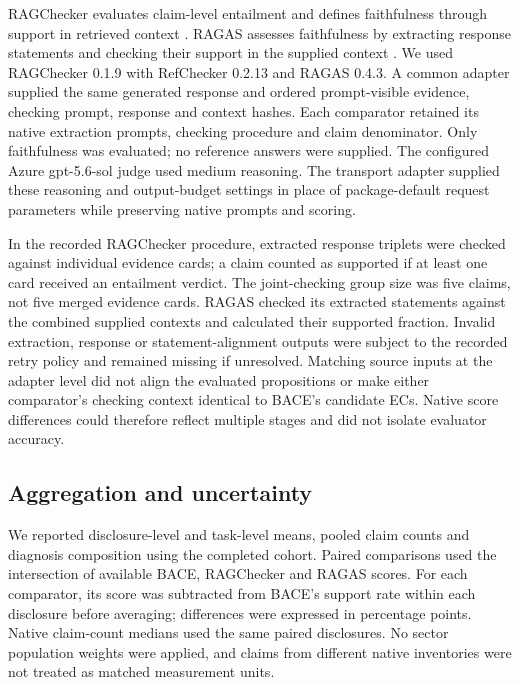 \documentclass[11pt,a4paper]{article}
\begin{document}
RAGChecker evaluates claim-level entailment and defines faithfulness through support in retrieved context \cite{ragchecker2024}. RAGAS assesses faithfulness by extracting response statements and checking their support in the supplied context \cite{ragas2024}. We used RAGChecker 0.1.9 with RefChecker 0.2.13 and RAGAS 0.4.3. A common adapter supplied the same generated response and ordered prompt-visible evidence, checking prompt, response and context hashes. Each comparator retained its native extraction prompts, checking procedure and claim denominator. Only faithfulness was evaluated; no reference answers were supplied. The configured Azure gpt-5.6-sol judge used medium reasoning. The transport adapter supplied these reasoning and output-budget settings in place of package-default request parameters while preserving native prompts and scoring.

In the recorded RAGChecker procedure, extracted response triplets were checked against individual evidence cards; a claim counted as supported if at least one card received an entailment verdict. The joint-checking group size was five claims, not five merged evidence cards. RAGAS checked its extracted statements against the combined supplied contexts and calculated their supported fraction. Invalid extraction, response or statement-alignment outputs were subject to the recorded retry policy and remained missing if unresolved. Matching source inputs at the adapter level did not align the evaluated propositions or make either comparator's checking context identical to BACE's candidate ECs. Native score differences could therefore reflect multiple stages and did not isolate evaluator accuracy.

\subsection*{Aggregation and uncertainty}

We reported disclosure-level and task-level means, pooled claim counts and diagnosis composition using the completed cohort. Paired comparisons used the intersection of available BACE, RAGChecker and RAGAS scores. For each comparator, its score was subtracted from BACE's support rate within each disclosure before averaging; differences were expressed in percentage points. Native claim-count medians used the same paired disclosures. No sector population weights were applied, and claims from different native inventories were not treated as matched measurement units.
\end{document}
